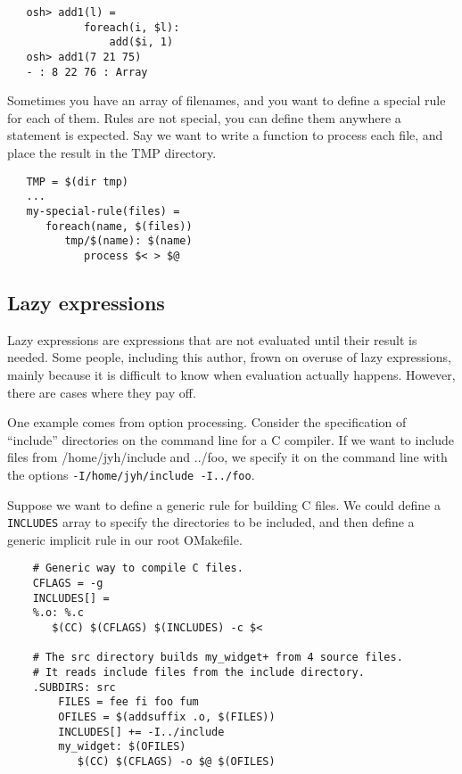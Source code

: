 \begin{verbatim}
   osh> add1(l) =
            foreach(i, $l):
                add($i, 1)
   osh> add1(7 21 75)
   - : 8 22 76 : Array
\end{verbatim}

Sometimes you have an array of filenames, and you want to define a special rule for each of them.
Rules are not special, you can define them anywhere a statement is expected.  Say we want to write a
function to process each file, and place the result in the TMP directory.

\begin{verbatim}
   TMP = $(dir tmp)
   ...
   my-special-rule(files) =
      foreach(name, $(files))
         tmp/$(name): $(name)
            process $< > $@
\end{verbatim}

\subsection{Lazy expressions}

Lazy expressions are expressions that are not evaluated until their result is needed.  Some people,
including this author, frown on overuse of lazy expressions, mainly because it is difficult to know
when evaluation actually happens.  However, there are cases where they pay off.

One example comes from option processing.  Consider the specification of ``include'' directories on
the command line for a C compiler.  If we want to include files from /home/jyh/include and ../foo,
we specify it on the command line with the options \verb+-I/home/jyh/include -I../foo+.

Suppose we want to define a generic rule for building C files.  We could define a \verb+INCLUDES+
array to specify the directories to be included, and then define a generic implicit rule in our root
OMakefile.

\begin{verbatim}
    # Generic way to compile C files.
    CFLAGS = -g
    INCLUDES[] =
    %.o: %.c
       $(CC) $(CFLAGS) $(INCLUDES) -c $<

    # The src directory builds my_widget+ from 4 source files.
    # It reads include files from the include directory.
    .SUBDIRS: src
        FILES = fee fi foo fum
        OFILES = $(addsuffix .o, $(FILES))
        INCLUDES[] += -I../include
        my_widget: $(OFILES)
           $(CC) $(CFLAGS) -o $@ $(OFILES)
\end{verbatim}

